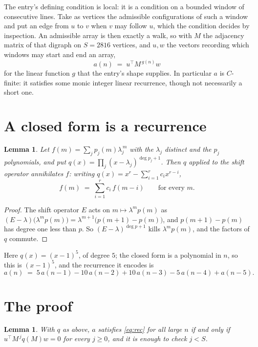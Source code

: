 \documentclass[11pt,a4paper]{article}
\theoremstyle{plain}
\newtheorem{lemma}[theorem]{Lemma}
\theoremstyle{definition}
\begin{document}
The entry's defining condition is local: it is a condition on a bounded window of consecutive lines. Take as vertices the
admissible configurations of such a window and put an edge from $u$ to $v$ when $v$ may
follow $u$, which the condition decides by inspection. An admissible array is then exactly a
walk, so with $M$ the adjacency matrix of that digraph on $S=2816$ vertices, and $u,w$ the
vectors recording which windows may start and end an array,
\[
a(n)\;=\;u^{\!\top}M^{\,g(n)}w
\]
for the linear function $g$ that the entry's shape supplies. In particular $a$ is
$C$-finite: it satisfies some monic integer linear recurrence, though not necessarily a short
one.

\section{A closed form is a recurrence}

\begin{lemma}\label{lem:ann}
Let $f(m)=\sum_{j}p_j(m)\lambda_j^{\,m}$ with the $\lambda_j$ distinct and the $p_j$
polynomials, and put $q(x)=\prod_j(x-\lambda_j)^{\deg p_j+1}$. Then $q$ applied to the shift
operator annihilates $f$: writing $q(x)=x^{r}-\sum_{i=1}^{r}c_ix^{r-i}$,
\[
f(m)\;=\;\sum_{i=1}^{r}c_i\,f(m-i)\qquad\text{for every }m.
\]
\end{lemma}

\begin{proof}
The shift operator $E$ acts on $m\mapsto\lambda^{m}p(m)$ as
$(E-\lambda)\bigl(\lambda^{m}p(m)\bigr)=\lambda^{m+1}\bigl(p(m+1)-p(m)\bigr)$, and
$p(m+1)-p(m)$ has degree one less than $p$. So $(E-\lambda)^{\deg p+1}$ kills
$\lambda^{m}p(m)$, and the factors of $q$ commute.
\end{proof}

Here $q(x)=(x-1)^{5}$, of degree $5$; the closed form is a polynomial in $n$, so this is $(x-1)^{5}$, and the recurrence it encodes is
\begin{equation}\label{eq:rec}
a(n)\;=\;5\,a(n-1) - 10\,a(n-2) + 10\,a(n-3) - 5\,a(n-4) + a(n-5).
\end{equation}

\section{The proof}

\begin{lemma}\label{lem:crit}
With $q$ as above, $a$ satisfies \eqref{eq:rec} for all large $n$ if and only if
$u^{\!\top}M^{\,j}q(M)w=0$ for every $j\ge0$, and it is enough to check $j<S$.
\end{lemma}
\end{document}
